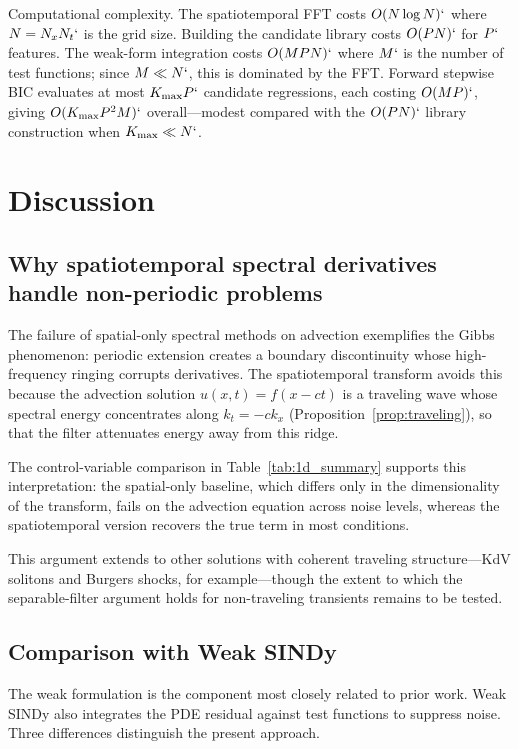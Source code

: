 \documentclass[preprint,12pt]{elsarticle}
\begin{document}
Computational complexity. The spatiotemporal FFT costs $O(N \log N)`$ where $N = N_x N_t`$ is the grid size. Building the candidate library costs $O(PN)`$ for $P`$ features. The weak-form integration costs $O(MPN)`$ where $M`$ is the number of test functions; since $M \ll N`$, this is dominated by the FFT. Forward stepwise BIC evaluates at most $K_{\max}P`$ candidate regressions, each costing $O(MP)`$, giving $O(K_{\max} P^2 M)`$ overall---modest compared with the $O(PN)`$ library construction when $K_{\max} \ll N`$.

\section{Discussion}
\label{sec:discussion}

\subsection{Why spatiotemporal spectral derivatives handle non-periodic problems}

The failure of spatial-only spectral methods on advection exemplifies the Gibbs phenomenon: periodic extension creates a boundary discontinuity whose high-frequency ringing corrupts derivatives. The spatiotemporal transform avoids this because the advection solution $u(x,t)=f(x-ct)$ is a traveling wave whose spectral energy concentrates along $k_t=-ck_x$ (Proposition~\ref{prop:traveling}), so that the filter attenuates energy away from this ridge.

The control-variable comparison in Table~\ref{tab:1d_summary} supports this interpretation: the spatial-only baseline, which differs only in the dimensionality of the transform, fails on the advection equation across noise levels, whereas the spatiotemporal version recovers the true term in most conditions.

This argument extends to other solutions with coherent traveling structure---KdV solitons and Burgers shocks, for example---though the extent to which the separable-filter argument holds for non-traveling transients remains to be tested.

\subsection{Comparison with Weak SINDy}

The weak formulation is the component most closely related to prior work. Weak SINDy \cite{messenger2021weak} also integrates the PDE residual against test functions to suppress noise. Three differences distinguish the present approach.
\end{document}

